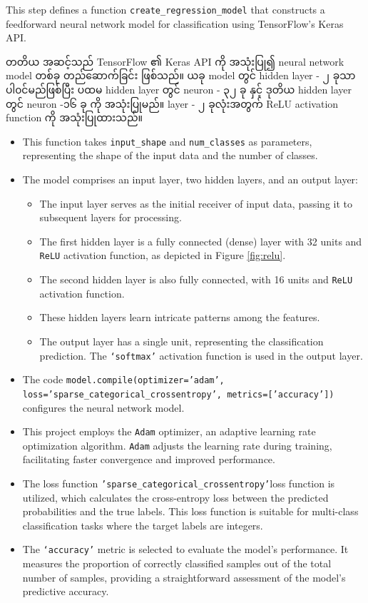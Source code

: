 \begin{step}
This step defines a function \texttt{create\_regression\_model} that constructs a feedforward neural network model for classification using TensorFlow's Keras API. 

တတိယ အဆင့်သည် TensorFlow ၏ Keras API ကို အသုံးပြု၍ neural network model တစ်ခု တည်ဆောက်ခြင်း ဖြစ်သည်။ ယခု model တွင် hidden layer - ၂ ခုသာ ပါ၀င်မည်ဖြစ်ပြီး ပထမ hidden layer တွင် neuron - ၃၂ ခု နှင့် ဒုတိယ hidden layer တွင် neuron -၁၆ ခု ကို အသုံးပြုမည်။ layer - ၂ ခုလုံးအတွက် ReLU activation function ကို အသုံးပြုထားသည်။ 

\begin{itemize}
    \item This function takes \texttt{input\_shape} and \texttt{num\_classes} as parameters, representing the shape of the input data and the number of classes.
    \item The model comprises an input layer, two hidden layers, and an output layer:
    \begin{itemize}
       \item The input layer serves as the initial receiver of input data, passing it to subsequent layers for processing.
       \item The first hidden layer is a fully connected (dense) layer with 32 units and \texttt{ReLU} activation function, as depicted in Figure \ref{fig:relu}.
       \item The second hidden layer is also fully connected, with 16 units and \texttt{ReLU} activation function.
       \item These hidden layers learn intricate patterns among the features.
       \item The output layer has a single unit, representing the classification prediction. The \texttt{`softmax'} activation function is used in the output layer.
    \end{itemize}
    
    \item The code \texttt{model.compile(optimizer='adam', loss='sparse\_categorical\_crossentropy', metrics=['accuracy'])} configures the neural network model. 
    \item This project employs the \texttt{Adam} optimizer, an adaptive learning rate optimization algorithm. \texttt{Adam} adjusts the learning rate during training, facilitating faster convergence and improved performance. 
    \item The loss function \texttt{'sparse\_categorical\_crossentropy'}loss function is utilized, which calculates the cross-entropy loss between the predicted probabilities and the true labels. This loss function is suitable for multi-class classification tasks where the target labels are integers.
    \item The \texttt{`accuracy'} metric is selected to evaluate the model's performance. It measures the proportion of correctly classified samples out of the total number of samples, providing a straightforward assessment of the model's predictive accuracy.
\end{itemize}
\end{step}

